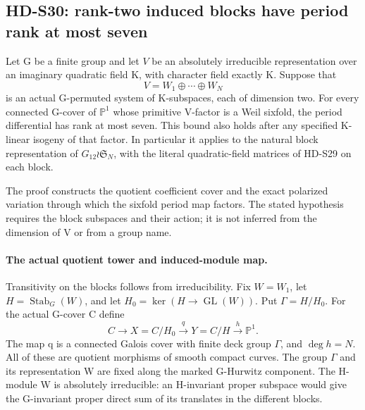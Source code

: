 \subsection{HD-S30: rank-two induced blocks have period rank at most seven}
\label{sec:rank-two-blocks}

Let G be a finite group and let \(V\) be an absolutely irreducible
representation over an imaginary quadratic field K, with character
field exactly K. Suppose that
\[
                 V=W_1\oplus\cdots\oplus W_N
\]
is an actual G-permuted system of K-subspaces, each of dimension two.
For every connected G-cover of \(\mathbb P^1\) whose primitive
V-factor is a Weil sixfold, the period differential has rank at most
seven. This bound also holds after any specified K-linear isogeny
of that factor. In particular it applies to the natural block
representation of \(G_{12}\wr\mathfrak S_N\), with the literal
quadratic-field matrices of HD-S29 on each block.

The proof constructs the quotient coefficient cover and the exact
polarized variation through which the sixfold period map factors.
The stated hypothesis requires the block subspaces and their action;
it is not inferred from the dimension of V or from a group name.

\paragraph{The actual quotient tower and induced-module map.}
Transitivity on the blocks follows from irreducibility. Fix
\(W=W_1\), let \(H=\operatorname{Stab}_G(W)\), and let
\(H_0=\ker(H\to\operatorname{GL}(W))\). Put
\(\Gamma=H/H_0\). For the actual G-cover C define
\[
 C\longrightarrow X=C/H_0\xrightarrow{q}Y=C/H
                  \xrightarrow{h}\mathbb P^1.
\]
The map q is a connected Galois cover with finite deck group
\(\Gamma\), and \(\deg h=N\). All of these are quotient
morphisms of smooth compact curves. The group \(\Gamma\)
and its representation W are fixed along the marked G-Hurwitz
component. The H-module W is absolutely irreducible: an H-invariant
proper subspace would give the G-invariant proper direct sum of its
translates in the different blocks.

